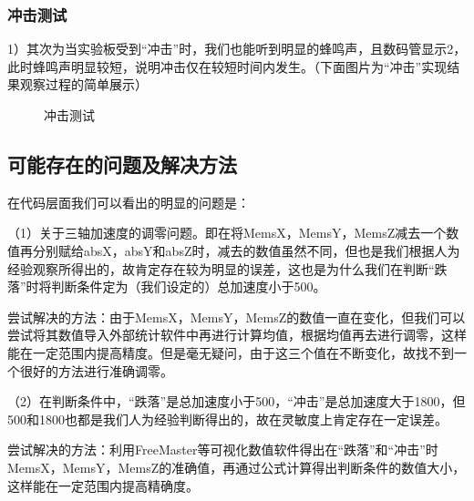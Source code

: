 \subsubsection{冲击测试}
\par{1）其次为当实验板受到“冲击”时，我们也能听到明显的蜂鸣声，且数码管显示2，此时蜂鸣声明显较短，说明冲击仅在较短时间内发生。（下面图片为“冲击”实现结果观察过程的简单展示）}

\begin{figure}[htbp]
\centering

%
%

\centering
\caption{冲击测试}\label{fig:5.2}
\end{figure}

\subsection{可能存在的问题及解决方法}
\par{在代码层面我们可以看出的明显的问题是：}
\par{（1）关于三轴加速度的调零问题。即在将MemsX，MemsY，MemsZ减去一个数值再分别赋给absX，absY和absZ时，减去的数值虽然不同，但也是我们根据人为经验观察所得出的，故肯定存在较为明显的误差，这也是为什么我们在判断“跌落”时将判断条件定为（我们设定的）总加速度小于500。}
\par{尝试解决的方法：由于MemsX，MemsY，MemsZ的数值一直在变化，但我们可以尝试将其数值导入外部统计软件中再进行计算均值，根据均值再去进行调零，这样能在一定范围内提高精度。但是毫无疑问，由于这三个值在不断变化，故找不到一个很好的方法进行准确调零。}
\par{（2）在判断条件中，“跌落”是总加速度小于500，“冲击”是总加速度大于1800，但500和1800也都是我们人为经验判断得出的，故在灵敏度上肯定存在一定误差。}
\par{尝试解决的方法：利用FreeMaster等可视化数值软件得出在“跌落”和“冲击”时MemsX，MemsY，MemsZ的准确值，再通过公式计算得出判断条件的数值大小，这样能在一定范围内提高精确度。}

